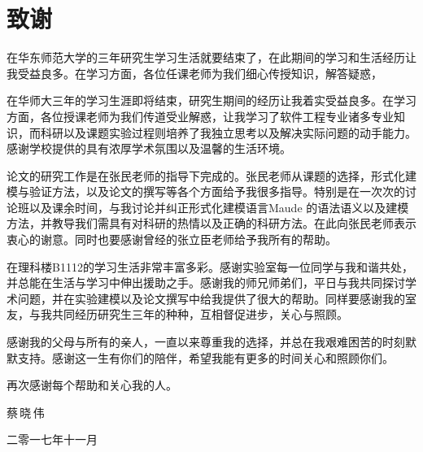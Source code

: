 {\kaishu
\chapter*{致\qquad 谢}

在华东师范大学的三年研究生学习生活就要结束了，在此期间的学习和生活经历让我受益良多。在学习方面，各位任课老师为我们细心传授知识，解答疑惑，


在华师大三年的学习生涯即将结束，研究生期间的经历让我着实受益良多。在学习方面，各位授课老师为我们传道受业解惑，让我学习了软件工程专业诸多专业知识，而科研以及课题实验过程则培养了我独立思考以及解决实际问题的动手能力。感谢学校提供的具有浓厚学术氛围以及温馨的生活环境。

论文的研究工作是在张民老师的指导下完成的。张民老师从课题的选择，形式化建模与验证方法，以及论文的撰写等各个方面给予我很多指导。特别是在一次次的讨论班以及课余时间，与我讨论并纠正形式化建模语言Maude 的语法语义以及建模方法，并教导我们需具有对科研的热情以及正确的科研方法。在此向张民老师表示衷心的谢意。同时也要感谢曾经的张立臣老师给予我所有的帮助。

在理科楼B1112的学习生活非常丰富多彩。感谢实验室每一位同学与我和谐共处，并总能在生活与学习中伸出援助之手。感谢我的师兄师弟们，平日与我共同探讨学术问题，并在实验建模以及论文撰写中给我提供了很大的帮助。同样要感谢我的室友，与我共同经历研究生三年的种种，互相督促进步，关心与照顾。

感谢我的父母与所有的亲人，一直以来尊重我的选择，并总在我艰难困苦的时刻默默支持。感谢这一生有你们的陪伴，希望我能有更多的时间关心和照顾你们。

再次感谢每个帮助和关心我的人。


\vspace{0.8cm} \hspace{9.8cm} 蔡\,晓\,伟

\hspace{9cm}  二零一七年十一月 }
